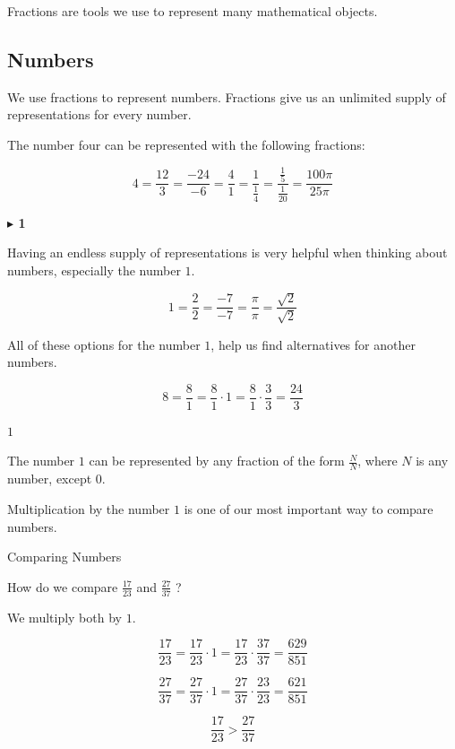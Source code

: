 \documentclass{ximera}
\begin{document}
Fractions are tools we use to represent many mathematical objects.



\subsection*{Numbers} 



We use fractions to represent numbers.  Fractions give us an unlimited supply of representations for every number.

The number four can be represented with the following fractions:

\[
4 = \frac{12}{3} = \frac{-24}{-6} = \frac{4}{1} = \frac{1}{\tfrac{1}{4}} = \frac{\tfrac{1}{5}}{\tfrac{1}{20}} = \frac{100\pi}{25\pi}
\]








\textbf{\textcolor{purple!85!blue}{$\blacktriangleright$ 1}} 



Having an endless supply of representations is very helpful when thinking about numbers, especially the number $1$. 


\[
1 = \frac{2}{2} = \frac{-7}{-7} = \frac{\pi}{\pi} = \frac{\sqrt{2}}{\sqrt{2}} 
\]


All of these options for the number $1$, help us find alternatives for another numbers.


\[
8 = \frac{8}{1} = \frac{8}{1} \cdot 1 = \frac{8}{1} \cdot \frac{3}{3} = \frac{24}{3}
\]




\begin{idea} \textbf{\textcolor{blue!55!black}{$1$}} 

The number $1$ can be represented by any fraction of the form $\frac{N}{N}$, where $N$ is any number, except $0$.


\end{idea}







Multiplication by the number $1$ is one of our most important way to compare numbers.




\begin{example}  Comparing Numbers

How do we compare $\frac{17}{23}$ and $\frac{27}{37}$ ? 

We multiply both by $1$.


\[
\frac{17}{23} = \frac{17}{23} \cdot 1 = \frac{17}{23} \cdot \frac{37}{37} = \frac{629}{851}
\]


\[
\frac{27}{37} = \frac{27}{37} \cdot 1 = \frac{27}{37} \cdot \frac{23}{23} = \frac{621}{851}
\]



\[
\frac{17}{23} > \frac{27}{37}
\]


\end{example}
\end{document}
